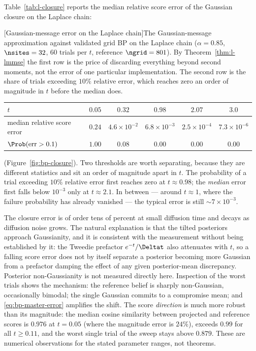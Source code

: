 Table~\ref{tab:l-closure} reports the median relative score error of the
Gaussian closure on the Laplace chain:
\begin{center}
\begin{minipage}{\linewidth}\centering
{}[Gaussian-message error on the Laplace chain]{The Gaussian-message approximation against validated grid BP on the Laplace chain ($\alpha = 0.85$, $\nsites = 32$, $60$ trials per $t$, reference $\ngrid = 801$). By Theorem~\ref{thm:l-lmmse} the first row is the price of discarding everything beyond second moments, not the error of one particular implementation. The second row is the share of trials exceeding $10\%$ relative error, which reaches zero an order of magnitude in $t$ before the median does.}
\label{tab:l-closure}
\begin{tabular}{@{}lccccc@{}}
\toprule
$t$ & $0.05$ & $0.32$ & $0.98$ & $2.07$ & $3.0$ \\
\midrule
median relative score error & $0.24$ & $4.6\times10^{-2}$
& $6.8\times10^{-3}$ & $2.5\times10^{-4}$ & $7.3\times10^{-6}$ \\
$\Prob(\mathrm{err} > 0.1)$ & $1.00$ & $0.08$ & $0.00$ & $0.00$ & $0.00$ \\
\bottomrule
\end{tabular}
\end{minipage}
\end{center}
\noindent(Figure~\ref{fig:bp-closure}). Two thresholds are worth separating,
because they are different statistics and sit an order of magnitude apart in
$t$. The probability of a trial exceeding $10\%$ relative error first reaches
zero at $t \approx 0.98$; the \emph{median} error first falls below $10^{-3}$
only at $t \approx 2.1$. In between --- around $t \approx 1$, where the
failure probability has already vanished --- the typical error is still
$\sim\!7\times10^{-3}$.

The closure error is of order tens of percent at small diffusion time and
decays as diffusion noise grows. The natural explanation is that the tilted
posteriors approach Gaussianity, and it is consistent with the measurement
without being established by it: the Tweedie prefactor $e^{-t}/\Deltat$ also
attenuates with $t$, so a falling score error does not by itself separate a
posterior becoming more Gaussian from a prefactor damping the effect of any
given posterior-mean discrepancy. Posterior non-Gaussianity is not measured
directly here. Inspection of
the worst trials shows the mechanism: the reference belief is sharply
non-Gaussian, occasionally bimodal; the single Gaussian commits to a
compromise mean; and \eqref{eq:bp-master-error} amplifies the shift. The
score \emph{direction} is much more robust than its magnitude: the median
cosine similarity between projected and reference scores is $0.976$ at
$t = 0.05$ (where the magnitude error is $24\%$), exceeds $0.99$ for all
$t \geq 0.11$, and the worst single trial of the sweep stays above $0.879$.
These are numerical observations for the stated parameter ranges, not
theorems.

